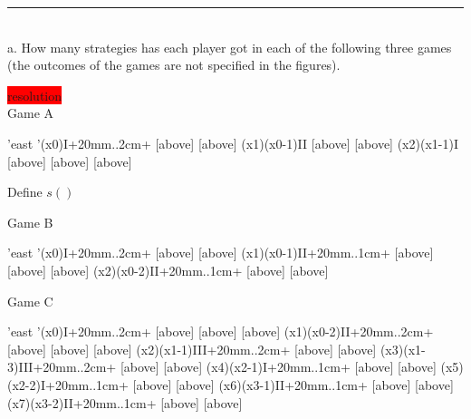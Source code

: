 \documentclass[10pt]{report}
\newenvironment{exercise}[1]
    {\vspace{0.5cm}\hrule\vspace{0.5cm}\noindent\fbox{#1}\\}
    {\vspace{0.5cm}}
\newenvironment{response}
{\vspace{0.2cm}\noindent\colorbox{red}{resolution}}
    {\vspace{0.5cm}}
\begin{document}
\begin{exercise}{3.5}
	a. How many strategies has each player got in each of the following three games (the outcomes of the games are not specified in the figures).

	\begin{response}\\
		\vspace{0.5cm}
		Game A\\
		\vspace{0.5cm}
		\begin{istgame}[sloped,font=\tiny]
			\setistgrowdirection'{east}
			\setistOvalNodeStyle{.6cm}
			\istrooto'(x0){I}+{20mm}..{2cm}+
			[above]
			[above]
			\endist
			\xtShowEndPoints[oval node, minimum size=6pt]
			\xtdistance{20mm}{10mm}
			\istrooto(x1)(x0-1){II}
			[above]
			[above]
			\endist
			\istrooto(x2)(x1-1){I}
			[above]
			[above]
			[above]
			\endist
		\end{istgame}

		Define $ s() $

		\vspace{0.5cm}
		Game B\\
		\vspace{0.5cm}
		\begin{istgame}[sloped,font=\tiny]
			\setistgrowdirection'{east}
			\setistOvalNodeStyle{.6cm}
			\istrooto'(x0){I}+{20mm}..{2cm}+
			[above]
			[above]
			\endist
			\xtShowEndPoints[oval node, minimum size=6pt]
			\xtdistance{20mm}{10mm}
			\istrooto(x1)(x0-1){II}+{20mm}..{1cm}+
			[above]
			[above]
			[above]
			\endist
			\istrooto(x2)(x0-2){II}+{20mm}..{1cm}+
			[above]
			[above]
			\endist
		\end{istgame}

		\vspace{0.5cm}
		Game C\\
		\vspace{0.5cm}
		\begin{istgame}[sloped,font=\tiny]
			\setistgrowdirection'{east}
			\setistOvalNodeStyle{.6cm}
			\istrooto'(x0){I}+{20mm}..{2cm}+
			[above]
			[above]
			[above]
			\endist
			\xtShowEndPoints[oval node, minimum size=6pt]
			\xtdistance{20mm}{10mm}
			\istrooto(x1)(x0-2){II}+{20mm}..{2cm}+
			[above]
			[above]
			[above]
			\endist
			\istrooto(x2)(x1-1){III}+{20mm}..{2cm}+
			[above]
			[above]
			\endist
			\istrooto(x3)(x1-3){III}+{20mm}..{2cm}+
			[above]
			[above]
			\endist
			\istrooto(x4)(x2-1){I}+{20mm}..{1cm}+
			[above]
			[above]
			\endist
			\istrooto(x5)(x2-2){I}+{20mm}..{1cm}+
			[above]
			[above]
			\endist
			\istrooto(x6)(x3-1){II}+{20mm}..{1cm}+
			[above]
			[above]
			\endist
			\istrooto(x7)(x3-2){II}+{20mm}..{1cm}+
			[above]
			[above]
			\endist
		\end{istgame}


\end{response}
\end{exercise}
\end{document}

